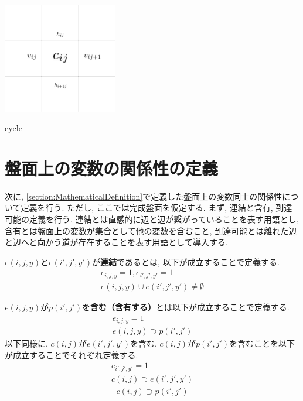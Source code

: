 \begin{clearpagefigure}
  \includegraphics[width=5cm]{fig/cycle.png}
  \caption{cycle}
  \label{fig:cycle}
\end{clearpagefigure}

\section{盤面上の変数の関係性の定義}\label{section:RelationDefinition}

次に, \cref{section:MathematicalDefinition}で定義した盤面上の変数同士の関係性について定義を行う. ただし, ここでは完成盤面を仮定する.
まず, 連結と含有, 到達可能の定義を行う.
連結とは直感的に辺と辺が繋がっていることを表す用語とし, 含有とは盤面上の変数が集合として他の変数を含むこと, 到達可能とは離れた辺と辺へと向かう道が存在することを表す用語として導入する.

\begin{definition}[連結]\label{definition:Connection}
  $e(i,j,y)$と$e(i',j',y')$が\textbf{連結}であるとは, 以下が成立することで定義する.
  \begin{gather*}
    e_{i,j,y}=1, e_{i',j',y'}  =     1          \\
    e(i,j,y)\cup e(i',j',y')  \neq  \emptyset
  \end{gather*}
\end{definition}

\begin{definition}[含有]\label{definition:Contain}
  $e(i,j,y)$が$p(i',j')$を\textbf{含む（含有する）}とは以下が成立することで定義する.
  \begin{gather*}
    e_{i,j,y}=1               \\
    e(i,j,y)\supset p(i',j')
  \end{gather*}
  以下同様に, $c(i,j)$が$e(i',j',y')$を含む, $c(i,j)$が$p(i',j')$を含むことを以下が成立することでそれぞれ定義する.
  \begin{gather*}
    e_{i',j',y'}=1             \\
    c(i,j)\supset e(i',j',y')
  \end{gather*}
  \begin{gather*}
    c(i,j)\supset p(i',j')
  \end{gather*}
\end{definition}


